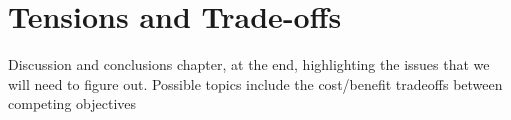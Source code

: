 \chapter[Tensions and Trade-offs]{Tensions and Trade-offs}
\label{chp:tradeoffs}


Discussion and conclusions chapter, at the end, highlighting the
issues that we will need to figure out. Possible topics include the
cost/benefit tradeoffs between competing objectives
